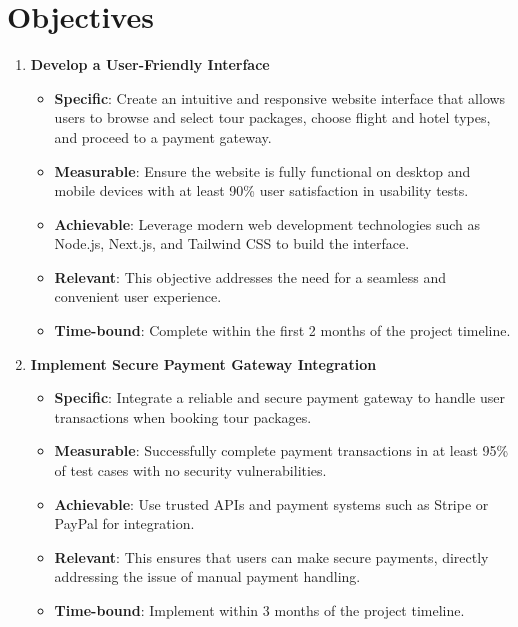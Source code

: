 \section{Objectives}

\begin{enumerate}
    \item \textbf{Develop a User-Friendly Interface}  
    \begin{itemize}
        \item \textbf{Specific}: Create an intuitive and responsive website interface that allows users to browse and select tour packages, choose flight and hotel types, and proceed to a payment gateway.  
        \item \textbf{Measurable}: Ensure the website is fully functional on desktop and mobile devices with at least 90\% user satisfaction in usability tests.  
        \item \textbf{Achievable}: Leverage modern web development technologies such as Node.js, Next.js, and Tailwind CSS to build the interface.  
        \item \textbf{Relevant}: This objective addresses the need for a seamless and convenient user experience.  
        \item \textbf{Time-bound}: Complete within the first 2 months of the project timeline.
    \end{itemize}

    \item \textbf{Implement Secure Payment Gateway Integration}  
    \begin{itemize}
        \item \textbf{Specific}: Integrate a reliable and secure payment gateway to handle user transactions when booking tour packages.  
        \item \textbf{Measurable}: Successfully complete payment transactions in at least 95\% of test cases with no security vulnerabilities.  
        \item \textbf{Achievable}: Use trusted APIs and payment systems such as Stripe or PayPal for integration.  
        \item \textbf{Relevant}: This ensures that users can make secure payments, directly addressing the issue of manual payment handling.  
        \item \textbf{Time-bound}: Implement within 3 months of the project timeline.
    \end{itemize}


\end{enumerate}
